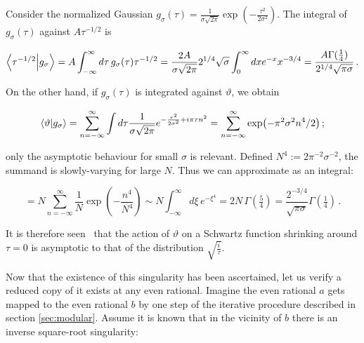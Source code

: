 \documentclass{article}
\newcommand{\intR}{\int_{-\infty}^\infty}
\newcommand{\sumZ}{\sum_{n=-\infty}^{\infty}}
\begin{document}
Consider the normalized Gaussian $g_\sigma(\tau) = \frac{1}{\sigma \sqrt{2\pi}} \exp(-\frac{\tau^2}{2\sigma^2})$. The integral of $g_\sigma(\tau)$ against $A \tau^{-1/2}$ is

\begin{equation}
    \bra{\tau^{-1/2}}\ket{g_\sigma} =  A \intR d\tau \, g_\sigma(\tau) \tau^{-1/2} = \frac{2A}{\sigma\sqrt{2\pi}} 2^{1/4} \sqrt\sigma \int_0^\infty dx e^{-x} x^{-3/4} = \frac{A\Gamma(\frac{1}{4})}{2^{1/4}\sqrt{\pi\sigma}}\,.
\end{equation}

On the other hand, if $g_\sigma(\tau)$ is integrated against $\vartheta$, we obtain

\begin{equation}
    \bra{\vartheta}\ket{g_\sigma} = \sumZ \int d\tau \frac{1}{\sigma \sqrt{2\pi}} e^{-\frac{\tau^2}{2\sigma^2} + i\pi\tau n^2}  = \sumZ \exp(-\pi^2 \sigma^2 n^4 / 2)\,; 
\end{equation}

only the asymptotic behaviour for small $\sigma$ is relevant. Defined $N^4 := 2 \pi^{-2} \sigma^{-2}$, the summand is slowly-varying for large $N$. Thus we can approximate as an integral:

\begin{equation}
    = N \sumZ \frac{1}{N} \exp(-\frac{n^4}{N^4}) \sim N \intR d\xi \, e^{-\xi^4} = 2 N \, \Gamma(\tfrac{5}{4}) = \frac{2^{-3/4}}{\sqrt{\pi\sigma}} \Gamma(\tfrac{1}{4})\,.
\end{equation}

It is therefore seen%
\ that the action of $\vartheta$ on a Schwartz function shrinking around $\tau=0$ is asymptotic to that of the distribution $\sqrt{\frac{i}{\tau}}$.

Now that the existence of this singularity has been ascertained, let us verify a reduced copy of it exists at any even rational. Imagine the even rational $a$ gets mapped to the even rational $b$ by one step of the iterative procedure described in section \ref{sec:modular}. Assume it is known that in the vicinity of $b$ there is an inverse square-root singularity:
\end{document}
